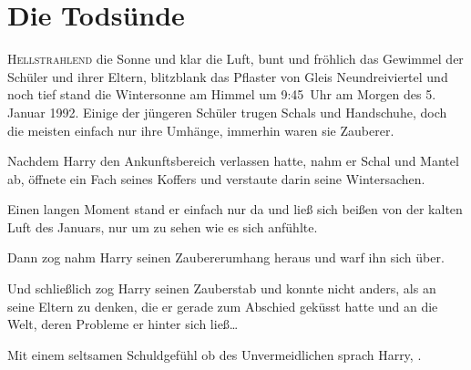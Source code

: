 \chapter{Die Todsünde}

\lettrine{H}{ellstrahlend} die Sonne und klar die Luft, bunt und fröhlich das Gewimmel der Schüler und ihrer Eltern, blitzblank das Pflaster von Gleis Neundreiviertel und noch tief stand die Wintersonne am Himmel um 9:45~Uhr am Morgen des 5. Januar 1992. Einige der jüngeren Schüler trugen Schals und Handschuhe, doch die meisten einfach nur ihre Umhänge, immerhin waren sie Zauberer.

Nachdem Harry den Ankunftsbereich verlassen hatte, nahm er Schal und Mantel ab, öffnete ein Fach seines Koffers und verstaute darin seine Wintersachen.

Einen langen Moment stand er einfach nur da und ließ sich beißen von der kalten Luft des Januars, nur um zu sehen wie es sich anfühlte.

Dann zog nahm Harry seinen Zaubererumhang heraus und warf ihn sich über.

Und schließlich zog Harry seinen Zauberstab und konnte nicht anders, als an seine Eltern zu denken, die er gerade zum Abschied geküsst hatte und an die Welt, deren Probleme er hinter sich ließ…

Mit einem seltsamen Schuldgefühl ob des Unvermeidlichen sprach Harry, .

